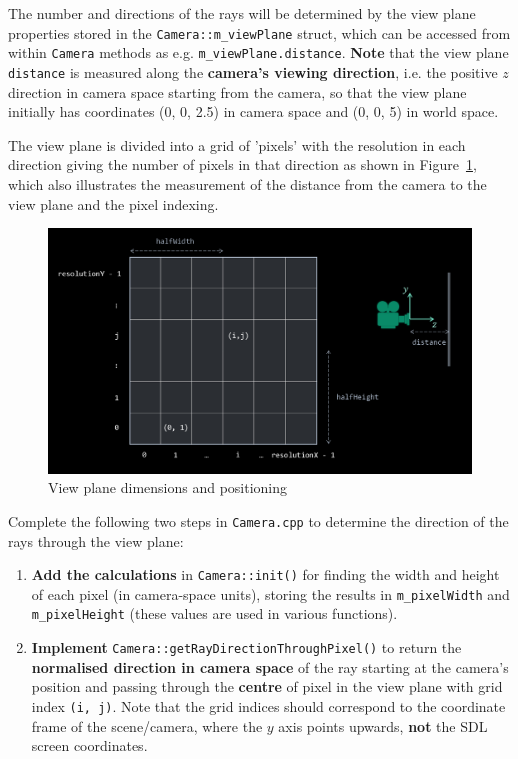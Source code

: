 \documentclass{../../../fal_assignment}
\begin{document}
The number and directions of the rays will be determined by the view plane properties stored in the \lstinline{Camera::m_viewPlane} struct, which can be accessed from within \lstinline{Camera} methods as e.g. \lstinline{m_viewPlane.distance}. \textbf{Note} that the view plane \lstinline{distance} is measured along the \textbf{camera's viewing direction}, i.e. the positive $z$ direction in camera space starting from the camera, so that the view plane initially has coordinates (0, 0, 2.5) in camera space and (0, 0, 5) in world space.

The view plane is divided into a grid of 'pixels' with the resolution in each direction giving the number of pixels in that direction as shown in Figure~\ref{fig:pixels}, which also illustrates the measurement of the distance from the camera to the view plane and the pixel indexing.

\begin{figure}[ht]
	\begin{center}
		\includegraphics[width=0.5\linewidth]{pixel_grid}
	\end{center}
	\caption{View plane dimensions and positioning}
	\label{fig:pixels}
\end{figure}

Complete the following two steps in \texttt{Camera.cpp} to determine the direction of the rays through the view plane:

\begin{enumerate}[label=(\alph*)]
	\item \textbf{Add the calculations} in \lstinline{Camera::init()} for finding the width and height of each pixel (in camera-space units), storing the results in \lstinline{m_pixelWidth} and \lstinline{m_pixelHeight} (these values are used in various functions).
	\item \textbf{Implement} \lstinline{Camera::getRayDirectionThroughPixel()} to return the \textbf{normalised direction in camera space} of the ray starting at the camera's position and passing through the \textbf{centre} of pixel in the view plane with grid index \lstinline{(i, j)}. Note that the grid indices should correspond to the coordinate frame of the scene/camera, where the $y$ axis points upwards, \textbf{not} the SDL screen coordinates.
\end{enumerate}
\end{document}
